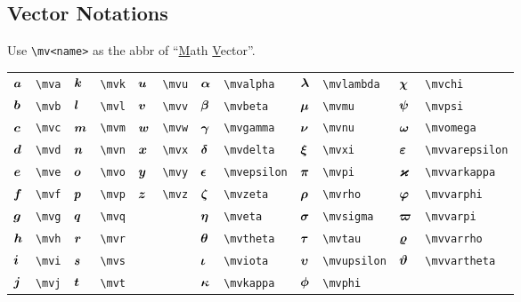 \documentclass{article}
\begin{document}
\subsection{Vector Notations}
Use \lstinline`\mv<name>` as the abbr of ``\underline{M}ath \underline{V}ector''.

\begin{tabular}{*{12}{l}}
    ${\bm a}$ & \lstinline`\mva` & ${\bm k}$ & \lstinline`\mvk` & ${\bm u}$ & \lstinline`\mvu` & ${\bm \alpha}$   & \lstinline`\mvalpha` & ${\bm \lambda}$  & \lstinline`\mvlambda` & ${\bm \chi}$        & \lstinline`\mvchi` \\
    ${\bm b}$ & \lstinline`\mvb` & ${\bm l}$ & \lstinline`\mvl` & ${\bm v}$ & \lstinline`\mvv` & ${\bm \beta}$    & \lstinline`\mvbeta` & ${\bm \mu}$      & \lstinline`\mvmu` & ${\bm \psi}$        & \lstinline`\mvpsi` \\
    ${\bm c}$ & \lstinline`\mvc` & ${\bm m}$ & \lstinline`\mvm` & ${\bm w}$ & \lstinline`\mvw` & ${\bm \gamma}$   & \lstinline`\mvgamma` & ${\bm \nu}$      & \lstinline`\mvnu` & ${\bm \omega}$      & \lstinline`\mvomega` \\
    ${\bm d}$ & \lstinline`\mvd` & ${\bm n}$ & \lstinline`\mvn` & ${\bm x}$ & \lstinline`\mvx` & ${\bm \delta}$   & \lstinline`\mvdelta` & ${\bm \xi}$      & \lstinline`\mvxi` & ${\bm \varepsilon}$ & \lstinline`\mvvarepsilon` \\
    ${\bm e}$ & \lstinline`\mve` & ${\bm o}$ & \lstinline`\mvo` & ${\bm y}$ & \lstinline`\mvy` & ${\bm \epsilon}$ & \lstinline`\mvepsilon` & ${\bm \pi}$      & \lstinline`\mvpi` & ${\bm \varkappa}$   & \lstinline`\mvvarkappa` \\
    ${\bm f}$ & \lstinline`\mvf` & ${\bm p}$ & \lstinline`\mvp` & ${\bm z}$ & \lstinline`\mvz` & ${\bm \zeta}$    & \lstinline`\mvzeta` & ${\bm \rho}$     & \lstinline`\mvrho` & ${\bm \varphi}$     & \lstinline`\mvvarphi` \\
    ${\bm g}$ & \lstinline`\mvg` & ${\bm q}$ & \lstinline`\mvq` &        &                         & ${\bm \eta}$     & \lstinline`\mveta` & ${\bm \sigma}$   & \lstinline`\mvsigma` & ${\bm \varpi}$      & \lstinline`\mvvarpi` \\
    ${\bm h}$ & \lstinline`\mvh` & ${\bm r}$ & \lstinline`\mvr` &        &                         & ${\bm \theta}$   & \lstinline`\mvtheta` & ${\bm \tau}$     & \lstinline`\mvtau` & ${\bm \varrho}$     & \lstinline`\mvvarrho` \\
    ${\bm i}$ & \lstinline`\mvi` & ${\bm s}$ & \lstinline`\mvs` &        &                         & ${\bm \iota}$    & \lstinline`\mviota` & ${\bm \upsilon}$ & \lstinline`\mvupsilon` & ${\bm \vartheta}$   & \lstinline`\mvvartheta` \\
    ${\bm j}$ & \lstinline`\mvj` & ${\bm t}$ & \lstinline`\mvt` &        &                         & ${\bm \kappa}$   & \lstinline`\mvkappa` & ${\bm \phi}$     & \lstinline`\mvphi` &                                           \\
\end{tabular}
\end{document}

